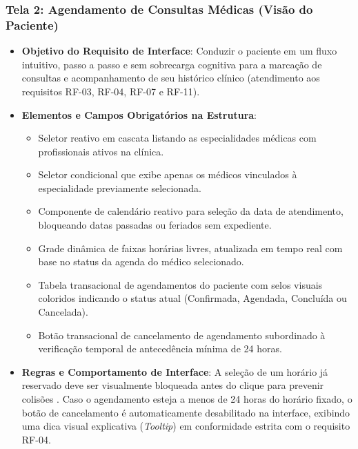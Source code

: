 \subsubsection{Tela 2: Agendamento de Consultas Médicas (Visão do Paciente)}
\begin{itemize}
    \item \textbf{Objetivo do Requisito de Interface}: Conduzir o paciente em um fluxo intuitivo, passo a passo e sem sobrecarga cognitiva para a marcação de consultas e acompanhamento de seu histórico clínico (atendimento aos requisitos RF-03, RF-04, RF-07 e RF-11).
    \item \textbf{Elementos e Campos Obrigatórios na Estrutura}:
    \begin{itemize}
        \item Seletor reativo em cascata listando as especialidades médicas com profissionais ativos na clínica.
        \item Seletor condicional que exibe apenas os médicos vinculados à especialidade previamente selecionada.
        \item Componente de calendário reativo para seleção da data de atendimento, bloqueando datas passadas ou feriados sem expediente.
        \item Grade dinâmica de faixas horárias livres, atualizada em tempo real com base no status da agenda do médico selecionado.
        \item Tabela transacional de agendamentos do paciente com selos visuais coloridos indicando o status atual (Confirmada, Agendada, Concluída ou Cancelada).
        \item Botão transacional de cancelamento de agendamento subordinado à verificação temporal de antecedência mínima de 24 horas.
    \end{itemize}
    \item \textbf{Regras e Comportamento de Interface}: A seleção de um horário já reservado deve ser visualmente bloqueada antes do clique para prevenir colisões \cite{norman2013}. Caso o agendamento esteja a menos de 24 horas do horário fixado, o botão de cancelamento é automaticamente desabilitado na interface, exibindo uma dica visual explicativa (\textit{Tooltip}) em conformidade estrita com o requisito RF-04.
\end{itemize}

